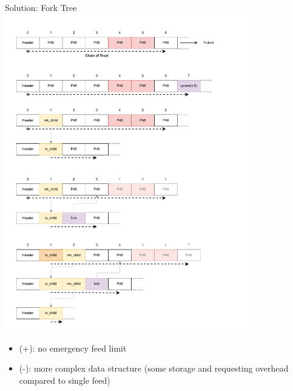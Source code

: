 \documentclass[aspectratio=169]{beamer}
\begin{document}
\begin{frame}[c]{Solution: Fork Tree}
        \includegraphics[width=0.8\textwidth]{images/fork_5.pdf}
        \begin{itemize}
        		\item (+): no emergency feed limit
		\item (-): more complex data structure (some storage and requesting overhead compared to single feed)
	\end{itemize}
\end{frame}
\end{document}
